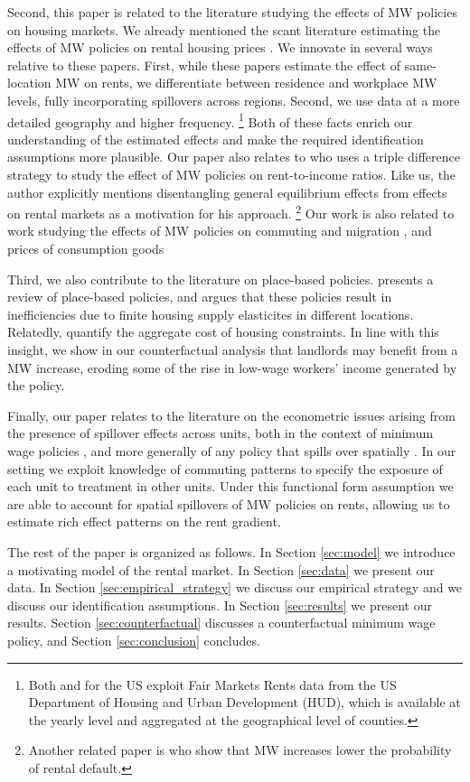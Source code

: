 Second, this paper is related to the literature studying the effects of MW 
policies on housing markets.
We already mentioned the scant literature estimating the effects of MW policies
on rental housing prices \parencite{Tidemann2018, Yamagishi2021}.
We innovate in several ways relative to these papers.
First, while these papers estimate the effect of same-location MW on rents, we 
differentiate between residence and workplace MW levels, fully incorporating
spillovers across regions.
Second, we use data at a more detailed geography and higher frequency.%
\footnote{Both \textcite{Tidemann2018} and \textcite{Yamagishi2019} for the US 
exploit Fair Markets Rents data from the US Department of Housing and Urban 
Development (HUD), which is available at the yearly level and aggregated at the
geographical level of counties.}
Both of these facts enrich our understanding of the estimated effects and make 
the required identification assumptions more plausible.
Our paper also relates to \textcite{Hughes2020} who uses a triple difference 
strategy to study the effect of MW policies on rent-to-income ratios. Like us, 
the author explicitly mentions disentangling general equilibrium effects from 
effects on rental markets as a motivation for his approach.
\footnote{Another related paper is \textcite{AgarwalEtAl2019} who show that MW
increases lower the probability of rental default.}
Our work is also related to work studying the effects of MW policies on 
commuting and migration \parencite{Cadena2014, Monras2019, PerezPerez2021}, and 
prices of consumption goods \parencite{AllegrettoReich2018, Leung2021}

Third, we also contribute to the literature on place-based policies.
\parencite{KlineMoretti2014} presents a review of place-based policies, and 
argues that these policies result in inefficiencies due to finite housing supply 
elasticites in different locations.
Relatedly, \textcite{HsiehMoretti2019} quantify the aggregate cost of housing 
constraints.
In line with this insight, we show in our counterfactual analysis that landlords
may benefit from a MW increase, eroding some of the rise in low-wage workers' 
income generated by the policy. 

Finally, our paper relates to the literature on the econometric issues arising 
from the presence of spillover effects across units,
both in the context of minimum wage policies \parencite{Kuehn2016, Huang2020}, 
and more generally of any policy that spills over spatially
\parencite{DelgadoFlorax2015, Butts2021}.
In our setting we exploit knowledge of commuting patterns to specify the 
exposure of each unit to treatment in other units.
Under this functional form assumption we are able to account for spatial 
spillovers of MW policies on rents, allowing us to estimate rich effect patterns 
on the rent gradient.

The rest of the paper is organized as follows.
In Section \ref{sec:model} we introduce a motivating model of the rental market.
In Section \ref{sec:data} we present our data.
In Section \ref{sec:empirical_strategy} we discuss our empirical strategy and
we discuss our identification assumptions.
In Section \ref{sec:results} we present our results.
Section \ref{sec:counterfactual} discusses a counterfactual minimum wage policy, and
Section \ref{sec:conclusion} concludes.
